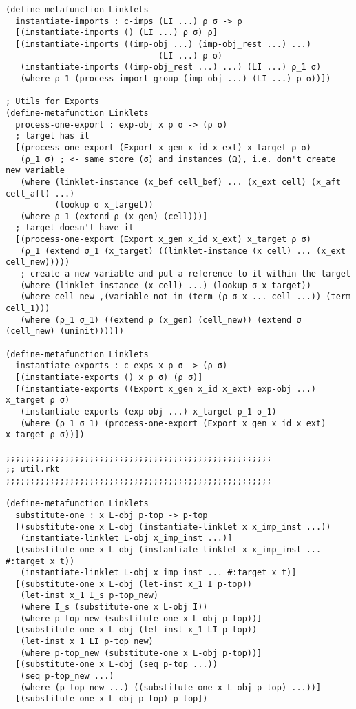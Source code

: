 \begin{lstlisting}[language=pltredex,
                basicstyle=\ttfamily\scriptsize,
                numbers=none, xleftmargin=2em]
(define-metafunction Linklets
  instantiate-imports : c-imps (LI ...) ρ σ -> ρ
  [(instantiate-imports () (LI ...) ρ σ) ρ]
  [(instantiate-imports ((imp-obj ...) (imp-obj_rest ...) ...)
                               (LI ...) ρ σ)
   (instantiate-imports ((imp-obj_rest ...) ...) (LI ...) ρ_1 σ)
   (where ρ_1 (process-import-group (imp-obj ...) (LI ...) ρ σ))])

; Utils for Exports
(define-metafunction Linklets
  process-one-export : exp-obj x ρ σ -> (ρ σ)
  ; target has it
  [(process-one-export (Export x_gen x_id x_ext) x_target ρ σ)
   (ρ_1 σ) ; <- same store (σ) and instances (Ω), i.e. don't create new variable
   (where (linklet-instance (x_bef cell_bef) ... (x_ext cell) (x_aft cell_aft) ...)
          (lookup σ x_target))
   (where ρ_1 (extend ρ (x_gen) (cell)))]
  ; target doesn't have it
  [(process-one-export (Export x_gen x_id x_ext) x_target ρ σ)
   (ρ_1 (extend σ_1 (x_target) ((linklet-instance (x cell) ... (x_ext cell_new)))))
   ; create a new variable and put a reference to it within the target
   (where (linklet-instance (x cell) ...) (lookup σ x_target))
   (where cell_new ,(variable-not-in (term (ρ σ x ... cell ...)) (term cell_1)))
   (where (ρ_1 σ_1) ((extend ρ (x_gen) (cell_new)) (extend σ (cell_new) (uninit))))])

(define-metafunction Linklets
  instantiate-exports : c-exps x ρ σ -> (ρ σ)
  [(instantiate-exports () x ρ σ) (ρ σ)]
  [(instantiate-exports ((Export x_gen x_id x_ext) exp-obj ...) x_target ρ σ)
   (instantiate-exports (exp-obj ...) x_target ρ_1 σ_1)
   (where (ρ_1 σ_1) (process-one-export (Export x_gen x_id x_ext) x_target ρ σ))])

;;;;;;;;;;;;;;;;;;;;;;;;;;;;;;;;;;;;;;;;;;;;;;;;;;;;;;
;; util.rkt
;;;;;;;;;;;;;;;;;;;;;;;;;;;;;;;;;;;;;;;;;;;;;;;;;;;;;;

(define-metafunction Linklets
  substitute-one : x L-obj p-top -> p-top
  [(substitute-one x L-obj (instantiate-linklet x x_imp_inst ...))
   (instantiate-linklet L-obj x_imp_inst ...)]
  [(substitute-one x L-obj (instantiate-linklet x x_imp_inst ... #:target x_t))
   (instantiate-linklet L-obj x_imp_inst ... #:target x_t)]
  [(substitute-one x L-obj (let-inst x_1 I p-top))
   (let-inst x_1 I_s p-top_new)
   (where I_s (substitute-one x L-obj I))
   (where p-top_new (substitute-one x L-obj p-top))]
  [(substitute-one x L-obj (let-inst x_1 LI p-top))
   (let-inst x_1 LI p-top_new)
   (where p-top_new (substitute-one x L-obj p-top))]
  [(substitute-one x L-obj (seq p-top ...))
   (seq p-top_new ...)
   (where (p-top_new ...) ((substitute-one x L-obj p-top) ...))]
  [(substitute-one x L-obj p-top) p-top])


\end{lstlisting}
